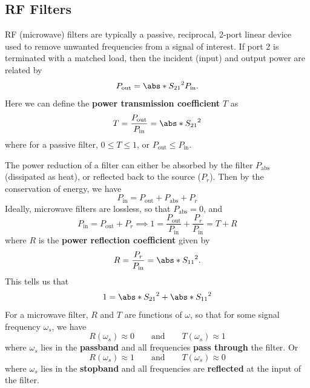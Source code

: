 \documentclass{article}
\begin{document}
\subsection{RF Filters}
RF (microwave) filters are typically a passive, reciprocal, 2-port
linear device used to remove unwanted frequencies from a signal of
interest. If port 2 is terminated with a matched load, then the incident
(input) and output power are related by
\begin{equation*}
    P_{\mathrm{out}} = \abs*{S_{21}}^2 P_{\mathrm{in}}.
\end{equation*}
Here we can define the \textbf{power transmission coefficient} \(T\) as
\begin{equation*}
    T = \frac{P_{\mathrm{out}}}{P_{\mathrm{in}}} = \abs*{S_{21}}^2
\end{equation*}
where for a passive filter, \(0 \leqslant T \leqslant 1\), or
\(P_{\mathrm{out}} \leqslant P_{\mathrm{in}}\).

The power reduction of a filter can either be absorbed by the filter \(P_{\mathrm{abs}}\)
(dissipated as heat), or reflected back to the source (\(P_r\)). Then by
the conservation of energy, we have
\begin{equation*}
    P_{\mathrm{in}} = P_{\mathrm{out}} + P_{\mathrm{abs}} + P_r
\end{equation*}
Ideally, microwave filters are lossless, so that \(P_{\mathrm{abs}} = 0\),
and
\begin{equation*}
    P_{\mathrm{in}} = P_{\mathrm{out}} + P_r \implies 1 = \frac{P_\mathrm{out}}{P_{\mathrm{in}}} + \frac{P_r}{P_{\mathrm{in}}} = T + R
\end{equation*}
where \(R\) is the \textbf{power reflection coefficient} given by
\begin{equation*}
    R = \frac{P_r}{P_{\mathrm{in}}} = \abs*{S_{11}}^2.
\end{equation*}
This tells us that
\begin{equation*}
    1 = \abs*{S_{21}}^2 + \abs*{S_{11}}^2
\end{equation*}
For a microwave filter, \(R\) and \(T\) are functions of \(\omega\), so
that for some signal frequency \(\omega_s\), we have
\begin{equation*}
    R\left( \omega_s \right) \approx 0 \qquad \text{and} \qquad T\left( \omega_s \right) \approx 1
\end{equation*}
where \(\omega_s\) lies in the \textbf{passband} and all frequencies
\textbf{pass through} the filter. Or
\begin{equation*}
R\left( \omega_s \right) \approx 1 \qquad \text{and} \qquad T\left( \omega_s \right) \approx 0
\end{equation*}
where \(\omega_s\) lies in the \textbf{stopband} and all frequencies
are \textbf{reflected} at the input of the filter.
\end{document}
